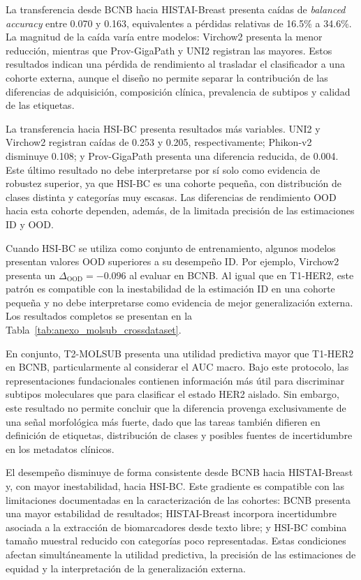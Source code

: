 La transferencia desde BCNB hacia HISTAI-Breast presenta caídas de \textit{balanced accuracy} entre 0.070 y 0.163, equivalentes a pérdidas relativas de 16.5\% a 34.6\%. La magnitud de la caída varía entre modelos: Virchow2 presenta la menor reducción, mientras que Prov-GigaPath y UNI2 registran las mayores. Estos resultados indican una pérdida de rendimiento al trasladar el clasificador a una cohorte externa, aunque el diseño no permite separar la contribución de las diferencias de adquisición, composición clínica, prevalencia de subtipos y calidad de las etiquetas.

La transferencia hacia HSI-BC presenta resultados más variables. UNI2 y Virchow2 registran caídas de 0.253 y 0.205, respectivamente; Phikon-v2 disminuye 0.108; y Prov-GigaPath presenta una diferencia reducida, de 0.004. Este último resultado no debe interpretarse por sí solo como evidencia de robustez superior, ya que HSI-BC es una cohorte pequeña, con distribución de clases distinta y categorías muy escasas. Las diferencias de rendimiento OOD hacia esta cohorte dependen, además, de la limitada precisión de las estimaciones ID y OOD.

Cuando HSI-BC se utiliza como conjunto de entrenamiento, algunos modelos presentan valores OOD superiores a su desempeño ID. Por ejemplo, Virchow2 presenta un $\Delta_{\text{OOD}}=-0.096$ al evaluar en BCNB. Al igual que en T1-HER2, este patrón es compatible con la inestabilidad de la estimación ID en una cohorte pequeña y no debe interpretarse como evidencia de mejor generalización externa. Los resultados completos se presentan en la Tabla~\ref{tab:anexo_molsub_crossdataset}.


En conjunto, T2-MOLSUB presenta una utilidad predictiva mayor que T1-HER2 en BCNB, particularmente al considerar el AUC macro. Bajo este protocolo, las representaciones fundacionales contienen información más útil para discriminar subtipos moleculares que para clasificar el estado HER2 aislado. Sin embargo, este resultado no permite concluir que la diferencia provenga exclusivamente de una señal morfológica más fuerte, dado que las tareas también difieren en definición de etiquetas, distribución de clases y posibles fuentes de incertidumbre en los metadatos clínicos.

El desempeño disminuye de forma consistente desde BCNB hacia HISTAI-Breast y, con mayor inestabilidad, hacia HSI-BC. Este gradiente es compatible con las limitaciones documentadas en la caracterización de las cohortes: BCNB presenta una mayor estabilidad de resultados; HISTAI-Breast incorpora incertidumbre asociada a la extracción de biomarcadores desde texto libre; y HSI-BC combina tamaño muestral reducido con categorías poco representadas. Estas condiciones afectan simultáneamente la utilidad predictiva, la precisión de las estimaciones de equidad y la interpretación de la generalización externa.

